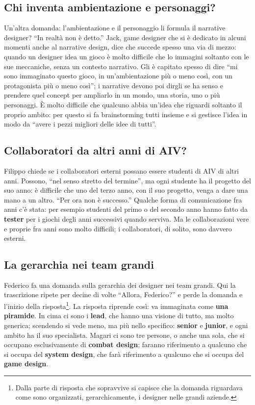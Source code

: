 \subsection{Chi inventa ambientazione e personaggi?}

Un'altra domanda: l'ambientazione e il personaggio li formula il narrative
designer? ``In realtà non è detto.'' Jack, game designer che si è dedicato
in alcuni momenti anche al narrative design, dice che succede spesso una via
di mezzo: quando un designer idea un gioco è molto difficile che lo immagini
soltanto con le sue meccaniche, senza un contesto narrativo. Gli è capitato
spesso di dire ``mi sono immaginato questo gioco, in un'ambientazione più o
meno così, con un protagonista più o meno così''; i narrative devono poi
dirgli se ha senso e prendere quel concept per ampliarlo in un mondo, una
storia, uno o più personaggi. È molto difficile che qualcuno abbia un'idea
che riguardi soltanto il proprio ambito: per questo si fa brainstorming
tutti insieme e si gestisce l'idea in modo da ``avere i pezzi migliori delle
idee di tutti''.

\subsection{Collaboratori da altri anni di AIV?}

Filippo chiede se i collaboratori esterni possano essere studenti di AIV di
altri anni. Possono, ``nel senso stretto del termine'', ma ogni studente ha
il progetto del suo anno: è difficile che uno del terzo anno, con il suo
progetto, venga a dare una mano a un altro. ``Per ora non è successo.''
Qualche forma di comunicazione fra anni c'è stata: per esempio studenti del
primo o del secondo anno hanno fatto da \textbf{tester} per i giochi degli
anni successivi quando serviva. Ma le collaborazioni vere e proprie fra anni
sono molto difficili; i collaboratori, di solito, sono davvero esterni.

\subsection{La gerarchia nei team grandi}
\label{p2:sec:gerarchia}

Federico fa una domanda sulla gerarchia dei designer nei team grandi. Qui la
trascrizione ripete per decine di volte ``Allora, Federico?'' e perde la
domanda e l'inizio della risposta\footnote{Dalla parte di risposta che
sopravvive si capisce che la domanda riguardava come sono organizzati,
gerarchicamente, i designer nelle grandi aziende.}. La risposta riprende
così: va immaginata come \textbf{una piramide}. In cima ci sono i
\textbf{lead}, che hanno una visione di tutto, ma molto generica; scendendo
si vede meno, ma più nello specifico: \textbf{senior} e \textbf{junior}, e
ogni ambito ha il suo specialista. Magari ci sono tre persone, o anche una
sola, che si occupano esclusivamente di \textbf{combat design}; faranno
riferimento a qualcuno che si occupa del \textbf{system design}, che farà
riferimento a qualcuno che si occupa del \textbf{game design}.

